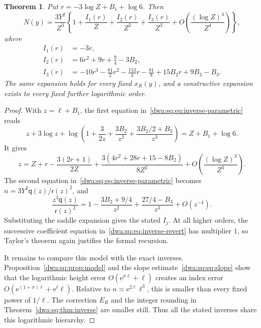 \documentclass[11pt,letterpaper]{article}
\numberwithin{equation}{section}
\newtheorem{theorem}{Theorem}[section]
\theoremstyle{remark}
\newcommand{\e}{\mathrm e}
\begin{document}
\begin{theorem}\label{dwa:sq:thm:inverse-log}
Put $r=-3\log Z+B_1+\log6$. Then
\begin{equation}\label{dwa:sq:eq:inverse-log}
 N(y)=\frac{3Y^2}{Z^3}
 \left\{1+\frac{I_1(r)}Z+\frac{I_2(r)}{Z^2}+\frac{I_3(r)}{Z^3}
 +O\left(\frac{(\log Z)^4}{Z^4}\right)\right\},
\end{equation}
where
\begin{align*}
 I_1(r)&=-3r,\\
 I_2(r)&=6r^2+9r+\frac94-3B_2,\\
 I_3(r)&=-10r^3-\frac{81}{2}r^2-\frac{153}{4}r-\frac{81}{8}
          +15B_2r+9B_2-B_3.
\end{align*}
The same expansion holds for every fixed $x_R(y)$, and a constructive expansion exists to every fixed further logarithmic order.
\end{theorem}
\begin{proof}
With $z=\ell+B_1$, the first equation in~\eqref{dwa:sq:eq:inverse-parametric} reads
\begin{equation}\label{dwa:sq:eq:inverse-revert}
 z+3\log z+\log\left(1+\frac{3}{2z}+\frac{3B_2}{z^2}
 +\frac{3B_2/2+B_3}{z^3}\right)=Z+B_1+\log6.
\end{equation}
It gives
\[
 z=Z+r-\frac{3(2r+1)}{2Z}
 +\frac{3(4r^2+28r+15-8B_2)}{8Z^2}
 +O\left(\frac{(\log Z)^3}{Z^3}\right).
\]
The second equation in~\eqref{dwa:sq:eq:inverse-parametric} becomes $n=3Y^2\mathsf q(z)/\mathsf r(z)^2$, and
\begin{equation}\label{dwa:sq:eq:inverse-quotient}
 \frac{z^3\mathsf q(z)}{\mathsf r(z)^2}
 =1-\frac{3B_2+9/4}{z^2}+\frac{27/4-B_3}{z^3}+O(z^{-4}).
\end{equation}
Substituting the saddle expansion gives the stated $I_j$. At all higher orders, the successive coefficient equation in~\eqref{dwa:sq:eq:inverse-revert} has multiplier $1$, so Taylor's theorem again justifies the formal recursion.

It remains to compare this model with the exact inverses. Proposition~\ref{dwa:sq:prop:model} and the slope estimate~\eqref{dwa:sq:eq:slope} show that the logarithmic height error $O(\e^{\sigma\ell}+\ell)$ creates an index error $O(\e^{(1+\sigma)\ell}+\e^\ell\ell)$. Relative to $n\asymp\e^{2\ell}\ell^3$, this is smaller than every fixed power of $1/\ell$. The correction $E_R$ and the integer rounding in Theorem~\ref{dwa:sq:thm:inverse} are smaller still. Thus all the stated inverses share this logarithmic hierarchy.
\end{proof}
\end{document}
